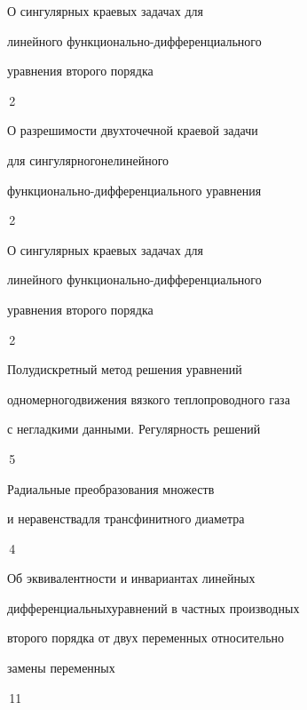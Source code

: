 {О сингулярных краевых задачах для\newline


линейного функционально-дифференциального


уравнения второго порядка}{\No\,2}








{О разрешимости двухточечной краевой задачи


для сингулярного\newline нелинейного 


функционально-дифференциального уравнения}{\No\,2}




{О сингулярных краевых задачах для\newline


линейного функционально-дифференциального


уравнения второго порядка}{\No\,2}




{Полудискретный метод решения уравнений


одномерного\newline движения вязкого теплопроводного газа


с негладкими данными. Регулярность решений}{\No\,5}




{Радиальные преобразования множеств


и неравенства\newline для трансфинитного диаметра}{\No\,4}




{Об эквивалентности и инвариантах линейных  


дифференциальных\newline уравнений в частных производных  


второго порядка от двух переменных относительно\newline


замены переменных}{\No\,11}


